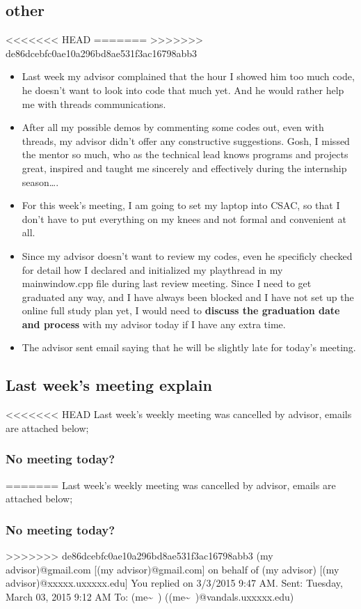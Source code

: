 \documentclass[9pt,b5paper]{article}
\begin{document}
\subsection{other}
<<<<<<< HEAD
\label{sec-3-2}
=======
\label{sec-2-2}
>>>>>>> de86dcebfc0ae10a296bd8ae531f3ac16798abb3
\begin{itemize}
\item Last week my advisor complained that the hour I showed him too much code, he doesn't want to look into code that much yet. And he would rather help me with threads communications.
\item After all my possible demos by commenting some codes out, even with threads, my advisor didn't offer any constructive suggestions. Gosh, I missed the mentor so much, who as the technical lead knows programs and projects great, inspired and taught me sincerely and effectively during the internship season\ldots{}.
\item For this week's meeting, I am going to set my laptop into CSAC, so that I don't have to put everything on my knees and not formal and convenient at all.
\item Since my advisor doesn't want to review my codes, even he specificly checked for detail how I declared and initialized my playthread in my mainwindow.cpp file during last review meeting. Since I need to get graduated any way, and I have always been blocked and I have not set up the online full study plan yet, I would need to \textbf{discuss the graduation date and process} with my advisor today if I have any extra time.
\item The advisor sent email saying that he will be slightly late for today's meeting.
\end{itemize}
\subsection{Last week's meeting explain}
<<<<<<< HEAD
\label{sec-3-3}
Last week's weekly meeting was cancelled by advisor, emails are attached below;

\subsubsection{No meeting today?}
\label{sec-3-3-1}
=======
\label{sec-2-3}
Last week's weekly meeting was cancelled by advisor, emails are attached below;

\subsubsection{No meeting today?}
\label{sec-2-3-1}
>>>>>>> de86dcebfc0ae10a296bd8ae531f3ac16798abb3
(my advisor)@gmail.com [(my advisor)@gmail.com] on behalf of (my advisor) [(my advisor)@xxxxx.uxxxxx.edu]
You replied on 3/3/2015 9:47 AM.
Sent:        Tuesday, March 03, 2015 9:12 AM
To:        (me\textasciitilde{}~) ((me\textasciitilde{}~)@vandals.uxxxxx.edu)
\end{document}
